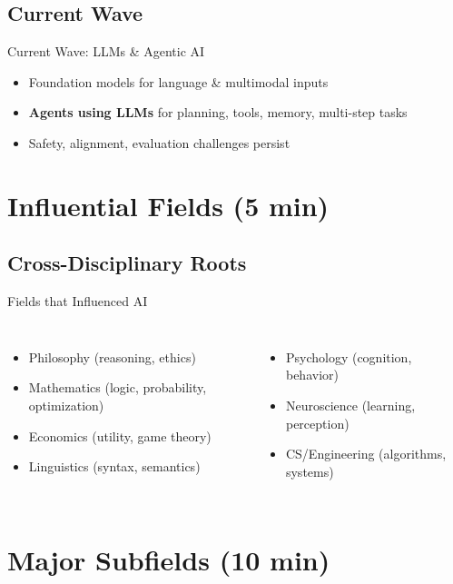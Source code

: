 \documentclass[aspectratio=169]{beamer}
\begin{document}
\subsection{Current Wave}
\begin{frame}{Current Wave: LLMs \& Agentic AI}
\begin{itemize}
  \item Foundation models for language \& multimodal inputs
  \item \textbf{Agents using LLMs} for planning, tools, memory, multi-step tasks
  \item Safety, alignment, evaluation challenges persist
\end{itemize}
\end{frame}

\section{Influential Fields (5 min)}

\subsection{Cross-Disciplinary Roots}
\begin{frame}{Fields that Influenced AI}
\begin{columns}[T,onlytextwidth]
\begin{itemize}
  \item Philosophy (reasoning, ethics)
  \item Mathematics (logic, probability, optimization)
  \item Economics (utility, game theory)
  \item Linguistics (syntax, semantics)
\end{itemize}
\begin{itemize}
  \item Psychology (cognition, behavior)
  \item Neuroscience (learning, perception)
  \item CS/Engineering (algorithms, systems)
\end{itemize}
\end{columns}
\end{frame}

\section{Major Subfields (10 min)}
\end{document}
